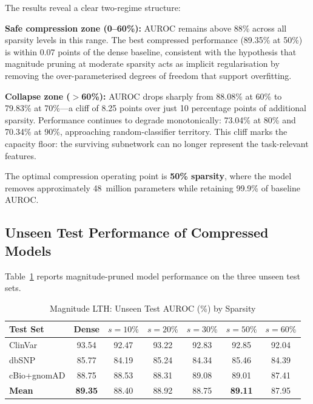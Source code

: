 \documentclass[journal]{IEEEtran}
\newcommand{\spars}[1]{$s{=}#1\%$}
\begin{document}
The results reveal a clear two-regime structure:

\textbf{Safe compression zone (0--60\%):} AUROC remains above
88\% across all sparsity levels in this range. The best
compressed performance (89.35\% at 50\%) is within
0.07 points of the dense baseline, consistent with the
hypothesis that magnitude pruning at moderate sparsity acts
as implicit regularisation by removing the over-parameterised
degrees of freedom that support overfitting.

\textbf{Collapse zone ($>$60\%):} AUROC drops sharply from
88.08\% at 60\% to 79.83\% at 70\%---a cliff of 8.25 points
over just 10 percentage points of additional sparsity.
Performance continues to degrade monotonically: 73.04\% at
80\% and 70.34\% at 90\%, approaching random-classifier
territory.
This cliff marks the capacity floor: the surviving subnetwork
can no longer represent the task-relevant features.

The optimal compression operating point is \textbf{50\% sparsity},
where the model removes approximately 48~million parameters
while retaining 99.9\% of baseline AUROC.

\subsection{Unseen Test Performance of Compressed Models}

Table~\ref{tab:mag_test} reports magnitude-pruned model
performance on the three unseen test sets.

\begin{table}[!t]
\centering
\caption{Magnitude LTH: Unseen Test AUROC (\%) by Sparsity}
\label{tab:mag_test}
\renewcommand{\arraystretch}{1.2}
\begin{tabular}{@{}lcccccc@{}}
\toprule
\textbf{Test Set} & \textbf{Dense} & \spars{10} & \spars{20} &
\spars{30} & \spars{50} & \spars{60} \\
\midrule
ClinVar    & 93.54 & 92.47 & 93.22 & 92.83 & 92.85 & 92.04 \\
dbSNP      & 85.77 & 84.19 & 85.24 & 84.34 & 85.46 & 84.39 \\
cBio+gnomAD & 88.75 & 88.53 & 88.31 & 89.08 & 89.01 & 87.41 \\
\midrule
\textbf{Mean} & \textbf{89.35} & 88.40 & 88.92 & 88.75 &
\textbf{89.11} & 87.95 \\
\bottomrule
\end{tabular}
\end{table}
\end{document}
